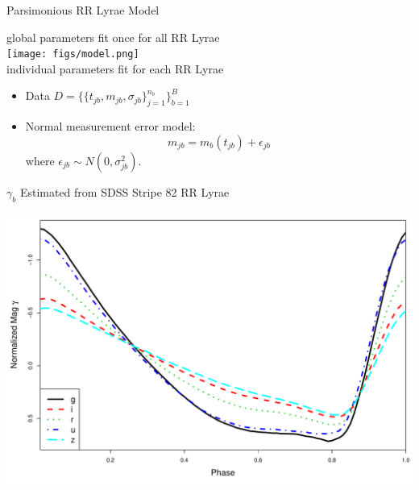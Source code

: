 \documentclass[12pt]{beamer}
\begin{document}


\begin{frame}{Parsimonious RR Lyrae Model}


\begin{center}
global parameters fit once for all RR Lyrae\\
\texttt{[image: figs/model.png]}\\
individual parameters fit for each RR Lyrae
\end{center}

\vspace{.2in}

\begin{itemize}
\item Data $D=\{\{t_{jb},m_{jb},\sigma_{jb}\}_{j=1}^{n_b}\}_{b=1}^B$
\item Normal measurement error model:
\begin{equation*}
m_{jb} = m_b(t_{jb}) + \epsilon_{jb}
\end{equation*}
where $\epsilon_{jb} \sim N(0,\sigma_{jb}^2)$.
\end{itemize}
\end{frame}

\begin{frame}{$\gamma_b$ Estimated from SDSS Stripe 82 RR Lyrae}

\begin{center}
\includegraphics[scale=.3]{figs/templates.pdf}
\end{center}

\end{frame}
\end{document}
